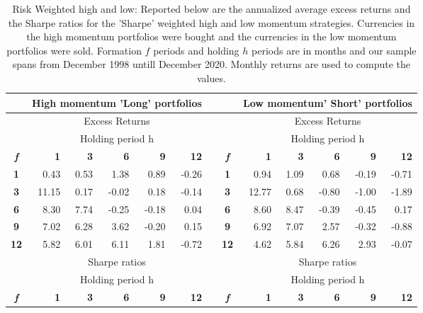 \documentclass{article}
\begin{document}
\begin{table}[htbp]
  \centering
  \caption{Risk Weighted high and low: Reported below are the annualized average excess returns and the Sharpe ratios for the 'Sharpe' weighted high and low momentum strategies. Currencies in the high momentum portfolios were bought and the currencies in the low momentum portfolios were sold. Formation $f$ periods and holding $h$ periods are in months and our sample spans from December 1998 untill December 2020. Monthly returns are used to compute the values.}
    \begin{tabular}{crrrrrrcrrrrr}
          & \multicolumn{5}{c}{\textbf{High momentum 'Long' portfolios}} &       &       & \multicolumn{5}{c}{\textbf{Low momentum' Short' portfolios}} \\
    \midrule
          & \multicolumn{5}{c}{Excess Returns}    &       &       & \multicolumn{5}{c}{Excess Returns} \\
\cmidrule{2-6}\cmidrule{9-13}          & \multicolumn{5}{c}{Holding period h}  &       &       & \multicolumn{5}{c}{Holding period h} \\
    \textit{\textbf{f}} & \textbf{1} & \textbf{3} & \textbf{6} & \textbf{9} & \textbf{12} &       & \textit{\textbf{f}} & \textbf{1} & \textbf{3} & \textbf{6} & \textbf{9} & \textbf{12} \\
\cmidrule{2-6}\cmidrule{9-13}    \textbf{1} & 0.43  & 0.53  & 1.38  & 0.89  & -0.26 &       & \textbf{1} & 0.94  & 1.09  & 0.68  & -0.19 & -0.71 \\
    \textbf{3} & 11.15 & 0.17  & -0.02 & 0.18  & -0.14 &       & \textbf{3} & 12.77 & 0.68  & -0.80 & -1.00 & -1.89 \\
    \textbf{6} & 8.30  & 7.74  & -0.25 & -0.18 & 0.04  &       & \textbf{6} & 8.60  & 8.47  & -0.39 & -0.45 & 0.17 \\
    \textbf{9} & 7.02  & 6.28  & 3.62  & -0.20 & 0.15  &       & \textbf{9} & 6.92  & 7.07  & 2.57  & -0.32 & -0.88 \\
    \textbf{12} & 5.82  & 6.01  & 6.11  & 1.81  & -0.72 &       & \textbf{12} & 4.62  & 5.84  & 6.26  & 2.93  & -0.07 \\
    \midrule
          & \multicolumn{5}{c}{Sharpe ratios}     &       &       & \multicolumn{5}{c}{Sharpe ratios} \\
    \midrule
          & \multicolumn{5}{c}{Holding period h}  &       &       & \multicolumn{5}{c}{Holding period h} \\
    \textit{\textbf{f}} & \textbf{1} & \textbf{3} & \textbf{6} & \textbf{9} & \textbf{12} &       & \textit{\textbf{f}} & \textbf{1} & \textbf{3} & \textbf{6} & \textbf{9} & \textbf{12} \\

\end{tabular}
\end{table}
\end{document}
